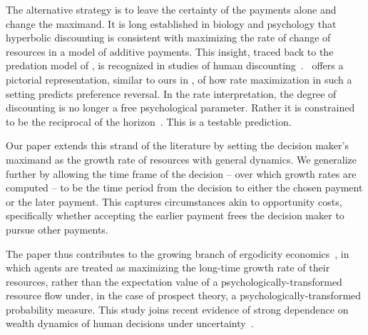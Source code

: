 The alternative strategy is to leave the certainty of the payments alone and change the maximand. It is long established in biology and psychology that hyperbolic discounting is consistent with maximizing the rate of change of resources in a model of additive payments. This insight, traced back to the predation model of \citet{Holling1959}, is recognized in studies of human discounting~\citep{MyersonGreen1995,Kacelnik1997,Sozou1998}.~\citet[Fig.~2]{Kacelnik1997} offers a pictorial representation, similar to ours in , of how rate maximization in such a setting predicts preference reversal. In the rate interpretation, the degree of discounting is no longer a free psychological parameter. Rather it is constrained to be the reciprocal of the horizon~\citep{MyersonGreen1995}. This is a testable prediction.

Our paper extends this strand of the literature by setting the decision maker's maximand as the growth rate of resources with general dynamics.
We generalize further by allowing the time frame of the decision -- over which growth rates are computed -- to be the time period from the decision to either the chosen payment or the later payment. This captures circumstances akin to opportunity costs, specifically whether accepting the earlier payment frees the decision maker to pursue other payments.

The paper thus contributes to the growing branch of ergodicity economics~\citep{PetersGell-Mann2016,BermanPetersAdamou2017,PetersAdamou2018a},
in which agents are treated as maximizing the long-time growth rate of their resources, rather than the expectation value of a psychologically-transformed resource flow under, in the case of prospect theory, a psychologically-transformed probability measure. This study joins recent evidence of strong dependence on wealth dynamics of human decisions under uncertainty~\citep{MederETAL2019}.


